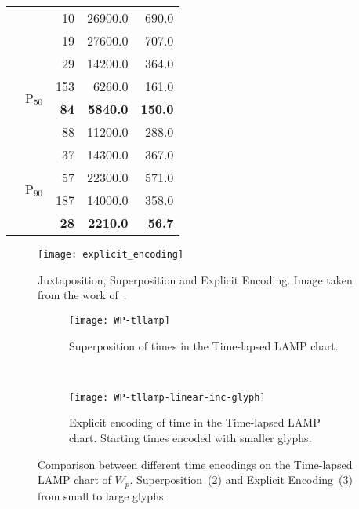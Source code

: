 \begin{table}[h]
\begin{tabular}{llrrr}
                            &                           & 10                & 26900.0          & 690.0          \\
                            &                           & 19                & 27600.0          & 707.0          \\ \cline{2-5} 
                            & \multirow{4}{*}{P$_{50}$} & 29                & 14200.0          & 364.0          \\
                            &                           & 153               & 6260.0          & 161.0          \\
                            &                           & \textbf{84}       & \textbf{5840.0} & \textbf{150.0} \\
                            &                           & 88                & 11200.0          & 288.0          \\ \cline{2-5} 
                            & \multirow{4}{*}{P$_{90}$} & 37                & 14300.0          & 367.0          \\
                            &                           & 57                & 22300.0          & 571.0          \\
                            &                           & 187               & 14000.0          & 358.0          \\
                            &                           & \textbf{28}       & \textbf{2210.0} & \textbf{56.7}  \\ \hline
  \end{tabular}
  \label{tab:cmg-results}
\end{table}

\begin{figure}[H]
  \centering
  \texttt{[image: explicit\_encoding]}
  \caption{Juxtaposition, Superposition and Explicit Encoding. Image taken from the work of~\cite{Szafir2018}.}
  \label{fig:explicit-endoding-szafir}
\end{figure}

\begin{figure}[H]
  \centering
  \begin{subfigure}[t]{0.75\textwidth}
    \centering
    \texttt{[image: WP-tllamp]}
    \caption{Superposition of times in the Time-lapsed LAMP chart.}
    \label{fig:superposition-tllamp-inc}
  \end{subfigure}
  ~
  \begin{subfigure}[t]{0.75\textwidth}
    \centering
    \texttt{[image: WP-tllamp-linear-inc-glyph]}
    \caption{Explicit encoding of time in the Time-lapsed LAMP chart. Starting times encoded with smaller glyphs.}
    \label{fig:ee-tllamp-inc}
  \end{subfigure}
  \caption{Comparison between different time encodings on the Time-lapsed LAMP chart of $W_p$. Superposition~(\ref{fig:superposition-tllamp-inc}) and Explicit Encoding~(\ref{fig:ee-tllamp-inc}) from small to large glyphs.}
  \label{fig:explicit-encoding-tllamp-inc}
\end{figure}

